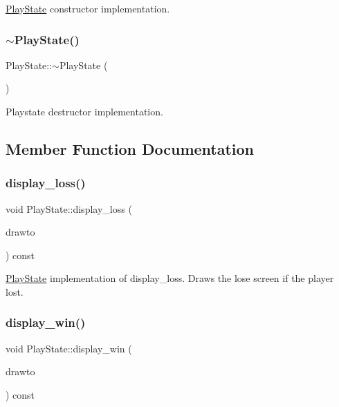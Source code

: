 \hyperlink{classPlayState}{Play\+State} constructor implementation. \mbox{\label{classPlayState_a2d9eafdd1495faf454b1350451b9d22f}} 
\subsubsection{\texorpdfstring{$\sim$\+Play\+State()}{~PlayState()}}
{\footnotesize\ttfamily Play\+State\+::$\sim$\+Play\+State (\begin{DoxyParamCaption}{ }\end{DoxyParamCaption})}

Playstate destructor implementation. 

\subsection{Member Function Documentation}
\mbox{\label{classPlayState_a7d1b378f21f1a42beea2382397c08916}} 
\subsubsection{\texorpdfstring{display\+\_\+loss()}{display\_loss()}}
{\footnotesize\ttfamily void Play\+State\+::display\+\_\+loss (\begin{DoxyParamCaption}\item[{sf\+::\+Render\+Window \&}]{drawto }\end{DoxyParamCaption}) const}

\hyperlink{classPlayState}{Play\+State} implementation of display\+\_\+loss. Draws the lose screen if the player lost. \mbox{\label{classPlayState_abc63c240c1f1ceb026e2ebf4aba45164}} 
\subsubsection{\texorpdfstring{display\+\_\+win()}{display\_win()}}
{\footnotesize\ttfamily void Play\+State\+::display\+\_\+win (\begin{DoxyParamCaption}\item[{sf\+::\+Render\+Window \&}]{drawto }\end{DoxyParamCaption}) const}

